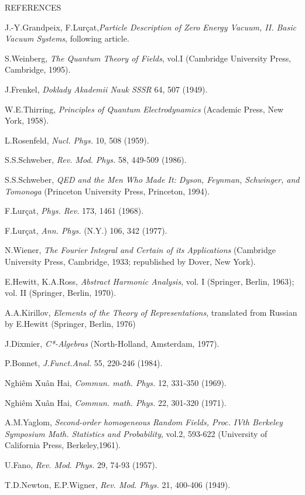 \documentclass[a4paper,11pt]{article}
\newcounter{num}
\begin{document}
REFERENCES
\begin{list}%
{}{}

\item J.-Y.Grandpeix, F.Lur\c{c}at,{\it Particle Description of Zero Energy Vacuum, II. Basic 
Vacuum Systems}, following article.
\item S.Weinberg, {\it The Quantum Theory of Fields}, vol.I (Cambridge University Press, 
Cambridge, 1995). \item J.Frenkel, {\it Doklady Akademii Nauk SSSR} 64, 507 (1949).
\item W.E.Thirring, {\it Principles of Quantum Electrodynamics} (Academic Press, New York, 
1958). \item L.Rosenfeld, {\it Nucl. Phys.} 10, 508 (1959).
\item S.S.Schweber, {\it Rev. Mod. Phys.} 58, 449-509 (1986).
\item S.S.Schweber, {\it QED and the Men Who Made It: Dyson, Feynman, Schwinger, and Tomonoga} 
(Princeton University Press, Princeton, 1994).
\item F.Lur\c{c}at, {\it Phys. Rev.} 173, 1461 (1968).
\item F.Lur\c{c}at, {\it Ann. Phys.} (N.Y.) 106, 342 (1977).
\item N.Wiener, {\it The Fourier Integral and Certain of its Applications} (Cambridge 
University Press, Cambridge, 1933; republished by Dover, New York).
\item E.Hewitt, K.A.Ross, {\it Abstract Harmonic Analysis}, vol. I (Springer, Berlin, 1963); 
vol. II (Springer, Berlin, 1970).
\item A.A.Kirillov, {\it Elements of the Theory of Representations}, translated from Russian by 
E.Hewitt (Springer, Berlin, 1976)
\item J.Dixmier, {\it C*-Algebras} (North-Holland, Amsterdam, 1977).
\item P.Bonnet, {\it J.Funct.Anal.} 55, 220-246 (1984).
\item Nghi\^em Xu\^an Hai, {\it Commun. math. Phys.} 12, 331-350 (1969).    
\item Nghi\^em Xu\^an Hai, {\it Commun. math. Phys.} 22, 301-320 (1971).
\item A.M.Yaglom, {\it Second-order homogeneous Random Fields, Proc. IVth Berkeley Symposium Math. 
Statistics and Probability}, vol.2, 593-622 (University of California Press, Berkeley,1961).
\item U.Fano, {\it Rev. Mod. Phys.} 29, 74-93 (1957).
\item T.D.Newton, E.P.Wigner, {\it Rev. Mod. Phys.} 21, 400-406 (1949).

\end{list}
\end{document}
